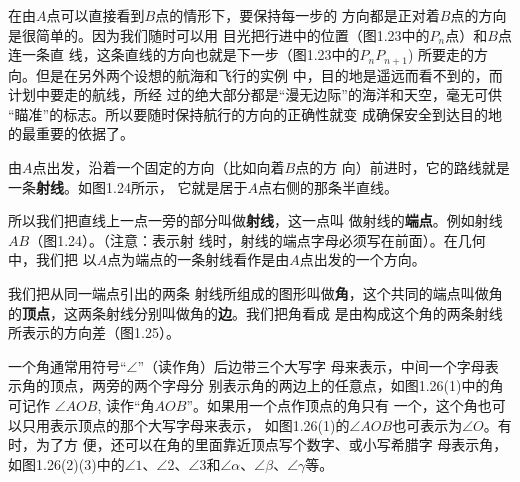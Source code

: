 在由$A$点可以直接看到$B$点的情形下，要保持每一步的
方向都是正对着$B$点的方向是很简单的。因为我们随时可以用
目光把行进中的位置（图1.23中的$P_n$点）和$B$点连一条直
线，这条直线的方向也就是下一步（图1.23中的$P_nP_{n+1}$)
所要走的方向。但是在另外两个设想的航海和飞行的实例
中，目的地是遥远而看不到的，而计划中要走的航线，所经
过的绝大部分都是“漫无边际”的海洋和天空，毫无可供
“瞄准”的标志。所以要随时保持航行的方向的正确性就变
成确保安全到达目的地的最重要的依据了。

由$A$点出发，沿着一个固定的方向（比如向着$B$点的方
向）前进时，它的路线就是一条\textbf{射线}。如图1.24所示，
它就是居于$A$点右侧的那条半直线。
\begin{figure}[htp]\centering
    \begin{minipage}[t]{0.48\textwidth}
    \centering
{}
    \caption{}
    \end{minipage}
    \begin{minipage}[t]{0.48\textwidth}
    \centering
    \caption{}
    \end{minipage}
    \end{figure}

所以我们把直线上一点一旁的部分叫做\textbf{射线}，这一点叫
做射线的\textbf{端点}。例如射线$AB$（图1.24）。（注意：表示射
线时，射线的端点字母必须写在前面）。在几何中，我们把
以$A$点为端点的一条射线看作是由$A$点出发的一个方向。

我们把从同一端点引出的两条
射线所组成的图形叫做\textbf{角}，这个共同的端点叫做角的\textbf{顶点}，这两条射线分别叫做角的\textbf{边}。我们把角看成
是由构成这个角的两条射线所表示的方向差（图1.25）。

一个角通常用符号“$\angle$”（读作角）后边带三个大写字
母来表示，中间一个字母表示角的顶点，两旁的两个字母分
别表示角的两边上的任意点，如图1.26(1)中的角可记作
$\angle AOB$, 读作“角$AOB$”。如果用一个点作顶点的角只有
一个，这个角也可以只用表示顶点的那个大写字母来表示，
如图1.26(1)的$\angle AOB$也可表示为$\angle O$。有时，为了方
便，还可以在角的里面靠近顶点写个数字、或小写希腊字
母表示角，如图1.26(2)(3)中的$\angle 1$、$\angle 2$、$\angle 3$和$\angle \alpha$、$\angle \beta$、$\angle \gamma$等。

